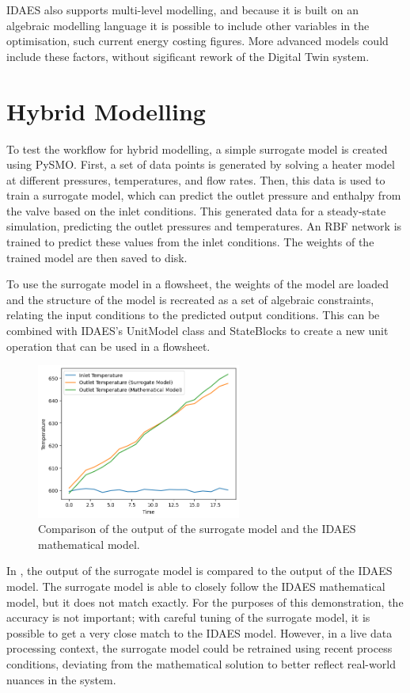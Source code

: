\documentclass[12pt]{article}
\begin{document}
IDAES also supports multi-level modelling, and because it is built on an algebraic modelling language it is possible to include other variables in the optimisation, such current energy costing figures. More advanced models could include these factors, without sigificant rework of the Digital Twin system.


\section{Hybrid Modelling}

To test the workflow for hybrid modelling, a simple surrogate model is created using PySMO. First, a set of data points is generated by solving a heater model at different pressures, temperatures, and flow rates. 
Then, this data is used to train a surrogate model, which can predict the outlet pressure and enthalpy from the valve based on the inlet conditions. 
This generated data for a steady-state simulation, predicting the outlet pressures and temperatures. 
An RBF network is trained to predict these values from the inlet conditions.
The weights of the trained model are then saved to disk. 

To use the surrogate model in a flowsheet, the weights of the model are loaded and the structure of the model is recreated as a set of algebraic constraints, relating the input conditions to the predicted output conditions. This can be combined with IDAES's UnitModel class and StateBlocks to create a new unit operation that can be used in a flowsheet.


\begin{figure}[h]
    \centering
    \includegraphics[width=0.6\textwidth]{surrogate_model_accuracy.png}
    \caption{Comparison of the output of the surrogate model and the IDAES mathematical model.}
    \label{fig:surrogate_model}
\end{figure}

In , the output of the surrogate model is compared to the output of the IDAES model. The surrogate model is able to closely follow the IDAES mathematical model, but it does not match exactly. For the purposes of this demonstration, the accuracy is not important; with careful tuning of the surrogate model, it is possible to get a very close match to the IDAES model. However, in a live data processing context, the surrogate model could be retrained using recent process conditions, deviating from the mathematical solution to better reflect real-world nuances in the system. 
\end{document}
